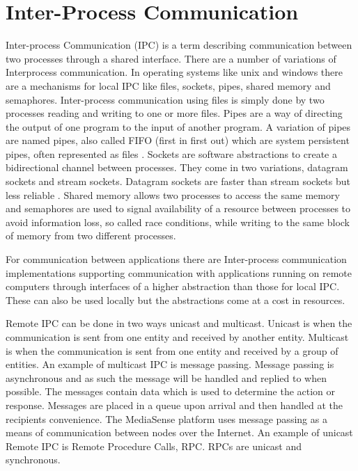 \section{Inter-Process Communication}
Inter-process Communication (IPC) is a term describing communication between two processes through a shared interface. There are a number of variations of Interprocess communication. In operating systems like unix and windows there are a mechanisms for local IPC like files, sockets, pipes, shared memory and semaphores. 
Inter-process communication using files is simply done by two processes reading and writing to one or more files. Pipes are a way of directing the output of one program to the input of another program. A variation of pipes are named pipes, also called FIFO (first in first out) which are system persistent pipes, often represented as files \cite{Lewandowski97interprocesscommunication}. Sockets are software abstractions to create a bidirectional channel between processes. They come in two variations, datagram sockets and stream sockets. Datagram sockets are faster than stream sockets but less reliable \cite{Lewandowski97interprocesscommunication}. Shared memory allows two processes to access the same memory and semaphores are used to signal availability of a resource between processes to avoid information loss, so called race conditions, while writing to the same block of memory from two different processes.

For communication between applications there are Inter-process communication implementations supporting communication with applications running on remote computers through interfaces of a higher abstraction than those for local IPC. These can also be used locally but the abstractions come at a cost in resources.

Remote IPC can be done in two ways unicast and multicast. Unicast is when the communication is sent from one entity and received by another entity. Multicast is when the communication is sent from one entity and received by a group of entities.
An example of multicast IPC is message passing. Message passing is asynchronous and as such the message will be handled and replied to when possible. The messages contain data which is used to determine the action or response. Messages are placed in a queue upon arrival and then handled at the recipients convenience. The MediaSense platform uses message passing as a means of communication between nodes over the Internet. An example of unicast Remote IPC is Remote Procedure Calls, RPC. RPCs are unicast and synchronous.

